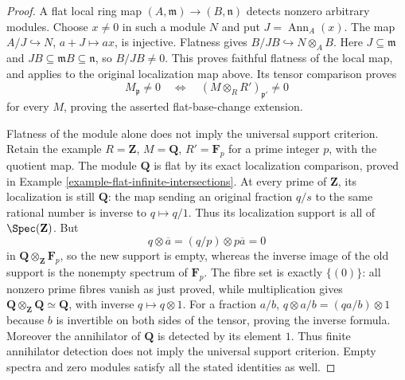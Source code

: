 \begin{proof}
A flat local ring map $(A,\mathfrak m)\to(B,\mathfrak n)$
detects nonzero arbitrary modules. Choose $x\ne0$ in such
a module $N$ and put $J=\operatorname{Ann}_A(x)$.
The map $A/J\hookrightarrow N$, $a+J\mapsto ax$, is
injective. Flatness gives $B/JB\hookrightarrow N\otimes_AB$.
Here $J\subseteq\mathfrak m$ and
$JB\subseteq\mathfrak mB\subseteq\mathfrak n$, so
$B/JB\ne0$. This proves faithful flatness of the local
map, and applies to the original localization map above.
Its tensor comparison proves
$$
M_{\mathfrak p}\ne0
\quad\Longleftrightarrow\quad
(M\otimes_RR')_{\mathfrak p'}\ne0
$$
for every $M$, proving the asserted flat-base-change extension.

Flatness of the module alone does not imply the universal
support criterion. Retain the example
$R=\mathbf Z$, $M=\mathbf Q$, $R'=\mathbf F_p$ for a
prime integer $p$, with the quotient map. The module
$\mathbf Q$ is flat by its exact localization comparison,
proved in Example \ref{example-flat-infinite-intersections}.
At every prime of $\mathbf Z$, its localization is still
$\mathbf Q$: the map sending an original fraction $q/s$
to the same rational number is inverse to $q\mapsto q/1$.
Thus its localization support is all of $\Spec(\mathbf Z)$.
But
$$
q\otimes\overline a=(q/p)\otimes p\overline a=0
$$
in $\mathbf Q\otimes_{\mathbf Z}\mathbf F_p$, so the
new support is empty, whereas the inverse image of the
old support is the nonempty spectrum of $\mathbf F_p$.
The fibre set is exactly $\{(0)\}$: all nonzero prime
fibres vanish as just proved, while multiplication gives
$\mathbf Q\otimes_{\mathbf Z}\mathbf Q\simeq\mathbf Q$,
with inverse $q\mapsto q\otimes1$. For a fraction $a/b$,
$q\otimes a/b=(qa/b)\otimes1$ because $b$ is invertible
on both sides of the tensor, proving the inverse formula.
Moreover the annihilator of $\mathbf Q$ is detected by
its element $1$. Thus finite annihilator detection does
not imply the universal support criterion. Empty spectra
and zero modules satisfy all the stated identities as well.
\end{proof}